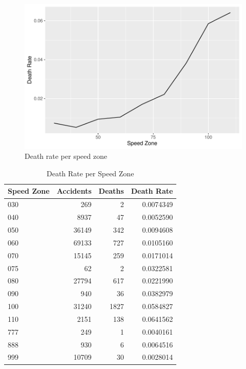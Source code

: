 \documentclass[11pt,a4paper,]{article}
\begin{document}
\begin{figure}
\centering
\includegraphics{Report_files/figure-latex/deaths-per-accident-plot-1.pdf}
\caption{\label{fig:deaths-per-accident-plot}Death rate per speed zone}
\end{figure}

\begin{table}

\caption{\label{tab:deaths-per-accident-table}Death Rate per Speed Zone}
\centering
\begin{tabular}[t]{l|r|r|r}
\hline
Speed Zone & Accidents & Deaths & Death Rate\\
\hline
030 & 269 & 2 & 0.0074349\\
\hline
040 & 8937 & 47 & 0.0052590\\
\hline
050 & 36149 & 342 & 0.0094608\\
\hline
060 & 69133 & 727 & 0.0105160\\
\hline
070 & 15145 & 259 & 0.0171014\\
\hline
075 & 62 & 2 & 0.0322581\\
\hline
080 & 27794 & 617 & 0.0221990\\
\hline
090 & 940 & 36 & 0.0382979\\
\hline
100 & 31240 & 1827 & 0.0584827\\
\hline
110 & 2151 & 138 & 0.0641562\\
\hline
777 & 249 & 1 & 0.0040161\\
\hline
888 & 930 & 6 & 0.0064516\\
\hline
999 & 10709 & 30 & 0.0028014\\
\hline
\end{tabular}
\end{table}
\end{document}
